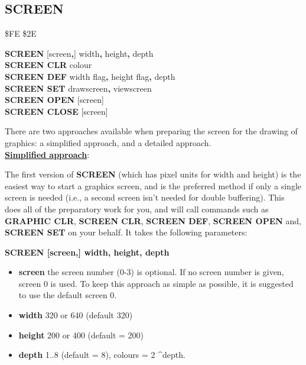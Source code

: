 \subsection{SCREEN}
\begin{description}[leftmargin=2cm,style=nextline]
\item [Token:] \$FE \$2E
\item [Format:] {\bf SCREEN} [screen{\bf,}] width{\bf,} height{\bf,} depth \\
                {\bf SCREEN CLR} colour \\
                {\bf SCREEN DEF} width flag{\bf,} height flag{\bf,} depth \\
                {\bf SCREEN SET} drawscreen{\bf,} viewscreen \\
                {\bf SCREEN OPEN} [screen] \\
                {\bf SCREEN CLOSE} [screen]

\item [Usage:] There are two approaches available when preparing the screen for the
               drawing of graphics: a simplified approach, and a detailed approach.
\\
    \underline{{\bf Simplified approach}}:

               The first version of {\bf SCREEN} (which has pixel
               units for width and height) is the easiest
               way to start a graphics screen, and is the preferred
               method if only a single screen is needed (i.e., a second screen
               isn't needed for double buffering). This does all of the
               preparatory work for you, and will call commands such as
               {\bf GRAPHIC CLR}, {\bf SCREEN CLR}, {\bf SCREEN DEF},
               {\bf SCREEN OPEN} and, {\bf SCREEN SET}
               on your behalf. It takes the following parameters:

               {\bf SCREEN [screen,] width, height, depth}

               \begin{itemize}
                \item {\bf screen} the screen number (0-3) is optional.
                If no screen number is given, screen 0 is used. To keep
                   this approach as simple as possible, it is suggested to
                   use the default screen 0.
                \item {\bf width} 320 or 640 (default 320)
                \item {\bf height} 200 or 400 (default = 200)
                \item {\bf depth} 1..8 (default = 8),
                   colours = 2 \textasciicircum depth.
               \end{itemize}


\end{description}
